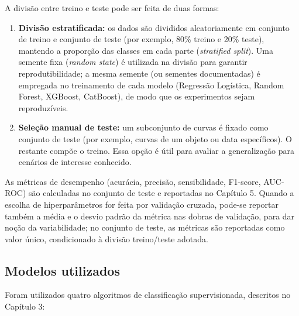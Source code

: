 \documentclass[msc]{on} %
\begin{document}
A divisão entre treino e teste pode ser feita de duas formas:

\begin{enumerate}
	\item \textbf{Divisão estratificada:} os dados são divididos aleatoriamente em conjunto de treino e conjunto de teste (por exemplo, 80\% treino e 20\% teste), mantendo a proporção das classes em cada parte (\textit{stratified split}). Uma semente fixa (\textit{random state}) é utilizada na divisão para garantir reprodutibilidade; a mesma semente (ou sementes documentadas) é empregada no treinamento de cada modelo (Regressão Logística, Random Forest, XGBoost, CatBoost), de modo que os experimentos sejam reproduzíveis.
	\item \textbf{Seleção manual de teste:} um subconjunto de curvas é fixado como conjunto de teste (por exemplo, curvas de um objeto ou data específicos). O restante compõe o treino. Essa opção é útil para avaliar a generalização para cenários de interesse conhecido.
\end{enumerate}

As métricas de desempenho (acurácia, precisão, sensibilidade, F1-score, AUC-ROC) são calculadas no conjunto de teste e reportadas no Capítulo 5. Quando a escolha de hiperparâmetros for feita por validação cruzada, pode-se reportar também a média e o desvio padrão da métrica nas dobras de validação, para dar noção da variabilidade; no conjunto de teste, as métricas são reportadas como valor único, condicionado à divisão treino/teste adotada.

\subsection{Modelos utilizados}

Foram utilizados quatro algoritmos de classificação supervisionada, descritos no Capítulo 3:
\end{document}
